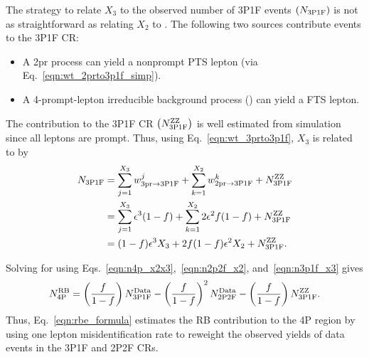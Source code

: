 The strategy to relate $X_3$ to the observed number of 3P1F events $\left( N_{\mathrm{3P1F}} \right)$ is not as straightforward as relating $X_2$ to \twoPtwoFexp.
The following two sources contribute events to the 3P1F CR:
\begin{itemize}
	\item A 2pr process can yield a nonprompt PTS lepton (via Eq.~\ref{eqn:wt_2prto3p1f_simp}).
	\item A 4-prompt-lepton irreducible background process (\ZZ) can yield a FTS lepton.
\end{itemize}
The \ZZ contribution to the 3P1F CR $\left( N_{\mathrm{3P1F}}^{\mathrm{ZZ}} \right)$ is well estimated from simulation since all leptons are prompt.
Thus, using Eq.~\ref{eqn:wt_3prto3p1f}, $X_3$ is related to \threePoneFexp by
\begin{align}
	\label{eqn:n3p1f_x3}
	N_{\mathrm{3P1F}}
	&= \sum_{j=1}^{X_{3}} w^{j}_{\mathrm{3pr \to 3P1F}} + \sum_{k=1}^{X_{2}} w^{k}_{\mathrm{2pr \to 3P1F}} + N_{\mathrm{3P1F}}^{\mathrm{ZZ}}
	\notag
	\\
	&= \sum_{j=1}^{X_{3}} \epsilon^3 (1-f) + \sum_{k=1}^{X_{2}} 2 \epsilon^2 f (1-f) + N_{\mathrm{3P1F}}^{\mathrm{ZZ}}
	\notag
	\\
	&= (1-f) \epsilon^3 X_{3} + 2 f (1-f) \epsilon^2 X_{2} + N_{\mathrm{3P1F}}^{\mathrm{ZZ}}.
\end{align}

Solving for \fourPexp using Eqs.~\ref{eqn:n4p_x2x3},~\ref{eqn:n2p2f_x2}, and~\ref{eqn:n3p1f_x3} gives
\begin{equation}
	\label{eqn:rbe_formula}
	N_{\mathrm{4P}}^{\mathrm{RB}} =
	\left( \frac{f}{1-f} \right) N_{\mathrm{3P1F}}^{\mathrm{Data}} -
	\left( \frac{f}{1-f} \right)^2 N_{\mathrm{2P2F}}^{\mathrm{Data}} - 
	\left( \frac{f}{1-f} \right) N_{\mathrm{3P1F}}^{\mathrm{ZZ}}.
\end{equation}
Thus, Eq.~\ref{eqn:rbe_formula} estimates the RB contribution to the 4P region by using one lepton misidentification rate to reweight the observed yields of data events in the 3P1F and 2P2F CRs.

